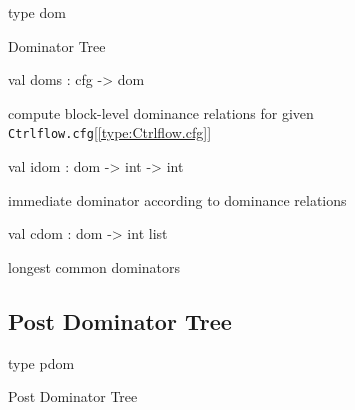 \documentclass[11pt]{article}
\begin{document}
\label{type:Ctrlflow.dom}\begin{ocamldoccode}
type dom 
\end{ocamldoccode}
\begin{ocamldocdescription}
Dominator Tree


\end{ocamldocdescription}




\label{val:Ctrlflow.doms}\begin{ocamldoccode}
val doms : cfg -> dom
\end{ocamldoccode}
\begin{ocamldocdescription}
compute block-level dominance relations for given {\tt{Ctrlflow.cfg}}[\ref{type:Ctrlflow.cfg}]


\end{ocamldocdescription}




\label{val:Ctrlflow.idom}\begin{ocamldoccode}
val idom : dom -> int -> int
\end{ocamldoccode}
\begin{ocamldocdescription}
immediate dominator according to dominance relations


\end{ocamldocdescription}




\label{val:Ctrlflow.cdom}\begin{ocamldoccode}
val cdom : dom -> int list
\end{ocamldoccode}
\begin{ocamldocdescription}
longest common dominators


\end{ocamldocdescription}




\subsection{Post Dominator Tree}




\label{type:Ctrlflow.pdom}\begin{ocamldoccode}
type pdom 
\end{ocamldoccode}
\begin{ocamldocdescription}
Post Dominator Tree


\end{ocamldocdescription}
\end{document}
